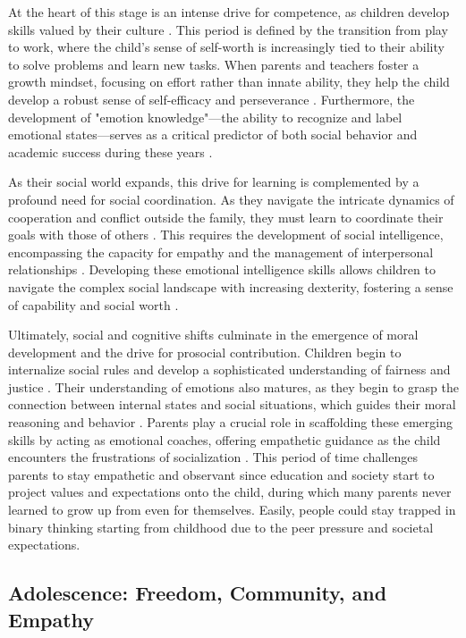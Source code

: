 At the heart of this stage is an intense drive for competence, as children develop skills valued by their culture \citep{erikson1950}. 
This period is defined by the transition from play to work, where the child's sense of self-worth is increasingly tied to their ability to solve problems and learn new tasks. 
When parents and teachers foster a growth mindset, focusing on effort rather than innate ability, they help the child develop a robust sense of self-efficacy and perseverance \citep{dweck2006}. 
Furthermore, the development of "emotion knowledge"---the ability to recognize and label emotional states---serves as a critical predictor of both social behavior and academic success during these years \citep{izard2001}.

As their social world expands, this drive for learning is complemented by a profound need for social coordination. 
As they navigate the intricate dynamics of cooperation and conflict outside the family, they must learn to coordinate their goals with those of others \citep{warneken2018}. 
This requires the development of social intelligence, encompassing the capacity for empathy and the management of interpersonal relationships \citep{goleman1995}. 
Developing these emotional intelligence skills allows children to navigate the complex social landscape with increasing dexterity, fostering a sense of capability and social worth \citep{salovey1990}.

Ultimately, social and cognitive shifts culminate in the emergence of moral development and the drive for prosocial contribution.
Children begin to internalize social rules and develop a sophisticated understanding of fairness and justice \citep{hoffman2000}. 
Their understanding of emotions also matures, as they begin to grasp the connection between internal states and social situations, which guides their moral reasoning and behavior \citep{dunn2000}. 
Parents play a crucial role in scaffolding these emerging skills by acting as emotional coaches, offering empathetic guidance as the child encounters the frustrations of socialization \citep{gottman1997}.
This period of time challenges parents to stay empathetic and observant since education and society start to project values and expectations onto the child, during which many parents never learned to grow up from even for themselves.
Easily, people could stay trapped in binary thinking starting from childhood due to the peer pressure and societal expectations.

\subsection{Adolescence: Freedom, Community, and Empathy}

